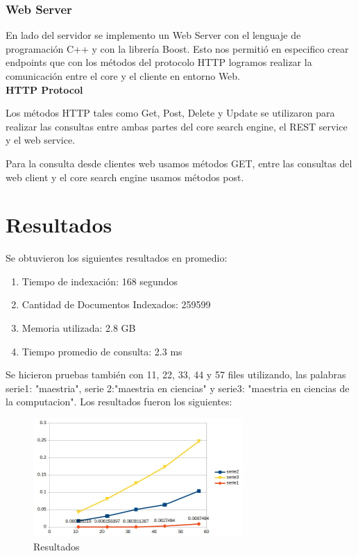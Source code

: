 \documentclass[a4paper]{article}
\begin{document}
\subsubsection{Web Server}

En lado del servidor se implemento un Web Server con el lenguaje de programación C++ y con la librería Boost. Esto nos permitió en especifico crear endpoints que con los métodos del protocolo HTTP logramos realizar la comunicación entre el core y el cliente en entorno Web. \\

\textbf{HTTP Protocol}

Los métodos HTTP tales como Get, Post, Delete y Update se utilizaron para realizar las consultas entre ambas partes del core search engine, el REST service y el web service.

Para la consulta desde clientes web usamos métodos GET, entre las consultas del web client y el core search engine usamos métodos post.



\section{Resultados}

Se obtuvieron los siguientes resultados en promedio:

\begin{enumerate}
    \item Tiempo de indexación: 168 segundos
    \item Cantidad de Documentos Indexados: 259599
    \item Memoria utilizada: 2.8 GB
    \item Tiempo promedio de consulta: 2.3 ms
\end{enumerate}

Se hicieron pruebas también con 11, 22, 33, 44 y 57 files utilizando, las palabras serie1: "maestria", serie 2:"maestria en ciencias" y serie3: "maestria en ciencias de la computacion". Los resultados fueron los siguientes:

\begin{figure}[H]
  \centering
  \includegraphics[width=8cm]{images/grafica.jpeg}
  \caption{Resultados}
  \label{grafica}
\end{figure}
\end{document}
